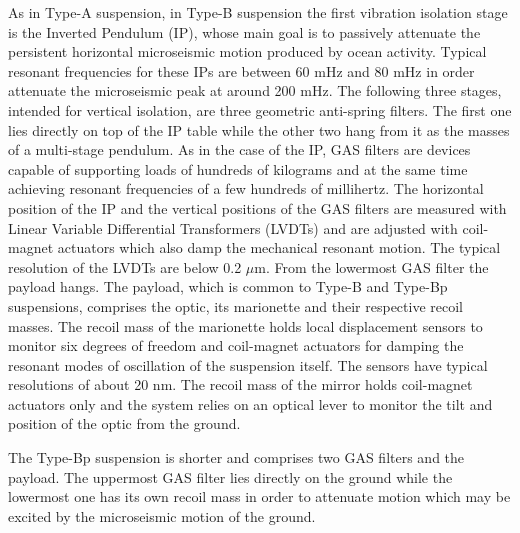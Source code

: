 As in Type-A suspension, in Type-B suspension the first vibration
isolation stage is the Inverted Pendulum (IP), whose main goal is
to passively attenuate the persistent horizontal microseismic motion
produced by ocean activity. Typical resonant frequencies for these
IPs are between 60 mHz and 80 mHz in order attenuate the microseismic
peak at around 200 mHz. The following three stages, intended for vertical
isolation, are three geometric anti-spring filters. The first one
lies directly on top of the IP table while the other two hang from
it as the masses of a multi-stage pendulum. As in the case of the
IP, GAS filters are devices capable of supporting loads of hundreds
of kilograms and at the same time achieving resonant frequencies of
a few hundreds of millihertz. The horizontal position of the IP and
the vertical positions of the GAS filters are measured with Linear
Variable Differential Transformers (LVDTs) and are adjusted with coil-magnet
actuators which also damp the mechanical resonant motion. The typical
resolution of the LVDTs are below 0.2 $\mu$m. From the lowermost
GAS filter the payload hangs. The payload, which is common to Type-B
and Type-Bp suspensions, comprises the optic, its marionette and their
respective recoil masses. The recoil mass of the marionette holds
local displacement sensors to monitor six degrees of freedom and coil-magnet
actuators for damping the resonant modes of oscillation of the suspension
itself. The sensors have typical resolutions of about 20 nm. The recoil
mass of the mirror holds coil-magnet actuators only and the system
relies on an optical lever to monitor the tilt and position of the
optic from the ground.

The Type-Bp suspension is shorter and comprises two GAS filters and
the payload. The uppermost GAS filter lies directly on the ground
while the lowermost one has its own recoil mass in order to attenuate
motion which may be excited by the microseismic motion of the ground.